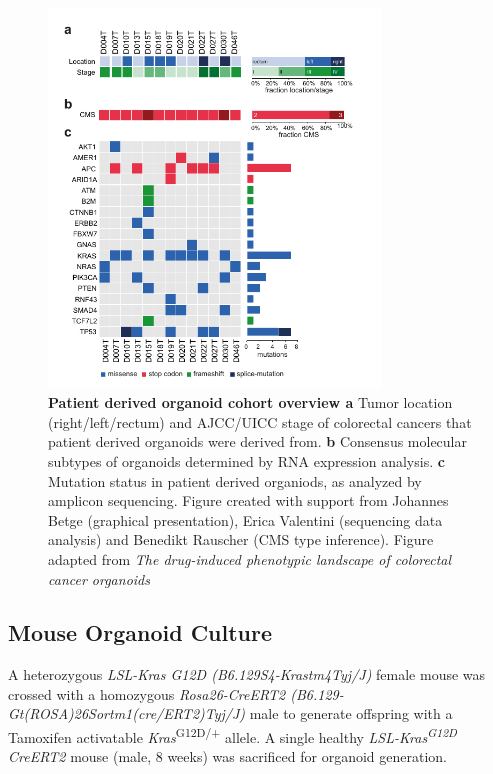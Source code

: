 \begin{flushleft}
\begin{figure}[!h]
\centering
\includegraphics[width=250pt,
                height=\textheight,
                keepaspectratio]{figures/promise/pdf/fig_1_0.pdf}
\caption[Patient derived organoid cohort overview]{\textbf{Patient derived organoid cohort overview a} Tumor location (right/left/rectum) and AJCC/UICC stage of colorectal cancers that patient derived organoids were derived from. \textbf{b}  Consensus molecular subtypes of organoids determined by RNA expression analysis. \textbf{c} Mutation status in patient derived organiods, as analyzed by amplicon sequencing. Figure created with support from Johannes Betge (graphical presentation),  Erica Valentini (sequencing data analysis) and Benedikt Rauscher (CMS type inference). Figure adapted from \textit{The drug-induced phenotypic landscape of colorectal cancer organoids} \parencite{betgeDruginducedPhenotypicLandscape2022}}
\label{fig_120}
\end{figure}


\subsection{Mouse Organoid Culture}
A heterozygous \textit{LSL-Kras G12D (B6.129S4-Krastm4Tyj/J)} female mouse was crossed with a homozygous \textit{Rosa26-CreERT2 (B6.129-Gt(ROSA)26Sortm1(cre/ERT2)Tyj/J)} male to generate offspring with a Tamoxifen activatable \textit{Kras}\textsuperscript{G12D/+} allele. A single healthy \textit{LSL-Kras\textsuperscript{G12D} CreERT2} mouse (male, 8 weeks) was sacrificed for organoid generation. \par 


\end{flushleft}
